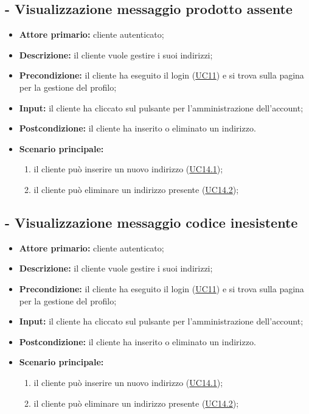 \stepUserCase
\subsection{ - Visualizzazione messaggio prodotto assente}
\begin{itemize}
    \item \textbf{Attore primario:} cliente autenticato;
    \item \textbf{Descrizione:} il cliente vuole gestire i suoi indirizzi;
    \item \textbf{Precondizione:} il cliente ha eseguito il login (\hyperref[UC11]{UC11}) e si trova sulla pagina per la gestione del profilo;
    \item \textbf{Input:} il cliente ha cliccato sul pulsante per l'amministrazione dell'account;
    \item \textbf{Postcondizione:} il cliente ha inserito o eliminato un indirizzo.
    \item \textbf{Scenario principale:}
          \begin{enumerate}
              \item il cliente può inserire un nuovo indirizzo (\hyperref[UC14.1]{UC14.1});
              \item il cliente può eliminare un indirizzo presente (\hyperref[UC14.2]{UC14.2});
          \end{enumerate}
\end{itemize}

\stepUserCase
\subsection{ - Visualizzazione messaggio codice inesistente}
\begin{itemize}
    \item \textbf{Attore primario:} cliente autenticato;
    \item \textbf{Descrizione:} il cliente vuole gestire i suoi indirizzi;
    \item \textbf{Precondizione:} il cliente ha eseguito il login (\hyperref[UC11]{UC11}) e si trova sulla pagina per la gestione del profilo;
    \item \textbf{Input:} il cliente ha cliccato sul pulsante per l'amministrazione dell'account;
    \item \textbf{Postcondizione:} il cliente ha inserito o eliminato un indirizzo.
    \item \textbf{Scenario principale:}
          \begin{enumerate}
              \item il cliente può inserire un nuovo indirizzo (\hyperref[UC14.1]{UC14.1});
              \item il cliente può eliminare un indirizzo presente (\hyperref[UC14.2]{UC14.2});
          \end{enumerate}
\end{itemize}